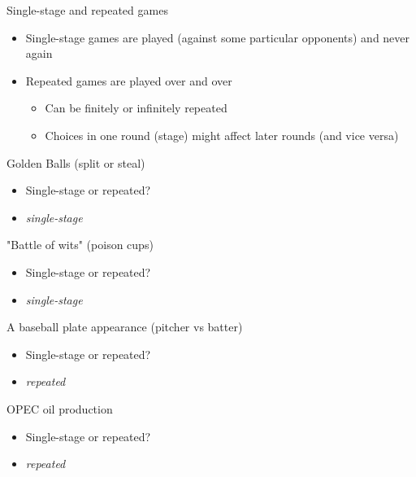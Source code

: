 \documentclass[10pt]{beamer}
\begin{document}
\begin{frame}[label={sec:org6dcce7c}]{}
\alert{Single-stage and repeated games}
\begin{itemize}
\item Single-stage games are played (against some particular opponents) and never again
\item Repeated games are played over and over
\begin{itemize}
\item Can be finitely or infinitely repeated
\item Choices in one round (stage) might affect later rounds (and vice versa)
\end{itemize}
\end{itemize}
\end{frame}

\begin{frame}[label={sec:org623360e}]{}
\alert{Golden Balls (split or steal)}
\begin{itemize}
\item Single-stage or repeated?
\end{itemize}
\begin{itemize}
\item \emph{single-stage}
\end{itemize}
\end{frame}

\begin{frame}[label={sec:org3e26b44}]{}
\alert{"Battle of wits" (poison cups)}
\begin{itemize}
\item Single-stage or repeated?
\end{itemize}
\begin{itemize}
\item \emph{single-stage}
\end{itemize}
\end{frame}

\begin{frame}[label={sec:org34c4cb7}]{}
\alert{A baseball plate appearance (pitcher vs batter)}
\begin{itemize}
\item Single-stage or repeated?
\end{itemize}
\begin{itemize}
\item \emph{repeated}
\end{itemize}
\end{frame}

\begin{frame}[label={sec:org5b2cdf0}]{}
\alert{OPEC oil production}
\begin{itemize}
\item Single-stage or repeated?
\end{itemize}
\begin{itemize}
\item \emph{repeated}
\end{itemize}
\end{frame}
\end{document}
